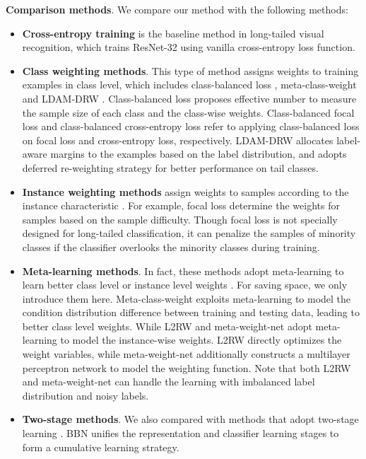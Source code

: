 \textbf{Comparison methods}. We compare our method with the following methods:
\begin{itemize}
	\item \textbf{Cross-entropy training} is the baseline method in long-tailed visual recognition, which trains ResNet-32 using vanilla cross-entropy loss function.
	\item \textbf{Class weighting methods}. This type of method assigns weights to training examples in class level, which includes class-balanced loss \cite{cui2019class}, meta-class-weight \cite{jamal2020rethinking} and LDAM-DRW \cite{cao2019learning}. Class-balanced loss proposes effective number to measure the sample size of each class and the class-wise weights. Class-balanced focal loss and class-balanced cross-entropy loss refer to applying class-balanced loss on focal loss and cross-entropy loss, respectively. LDAM-DRW allocates label-aware margins to the examples based on the label distribution, and adopts deferred re-weighting strategy for better performance on tail classes.
	\item \textbf{Instance weighting methods} assign weights to samples according to the instance characteristic \cite{L2RW,MetaWeightNet,lin2017focal}. For example, focal loss \cite{lin2017focal} determine the weights for samples based on the sample difficulty. Though focal loss is not specially designed for long-tailed classification, it can penalize the samples of minority classes if the classifier overlooks the minority classes during training.  

	\item \textbf{Meta-learning methods}. In fact, these methods adopt meta-learning to learn better class level or instance level weights \cite{jamal2020rethinking,MetaWeightNet,L2RW}. For saving space, we only introduce them here. Meta-class-weight \cite{jamal2020rethinking} exploits meta-learning to model the condition distribution difference between training and testing data, leading to better class level weights. While L2RW \cite{L2RW} and meta-weight-net \cite{MetaWeightNet} adopt meta-learning to model the instance-wise weights. L2RW directly optimizes the weight variables, while meta-weight-net additionally constructs a multilayer perceptron network to model the weighting function. Note that both L2RW and meta-weight-net can handle the learning with imbalanced label distribution and noisy labels.
	\item \textbf{Two-stage methods}. We also compared with methods that adopt two-stage learning \cite{jamal2020rethinking,cao2019learning,cui2018large}. BBN \cite{BBN} unifies the representation and classifier learning stages to form a cumulative learning strategy.
\end{itemize} 


